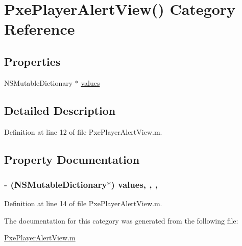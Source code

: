 \hypertarget{category_pxe_player_alert_view_07_08}{\section{Pxe\-Player\-Alert\-View() Category Reference}
\label{category_pxe_player_alert_view_07_08}
}
\subsection*{Properties}
\begin{DoxyCompactItemize}
\item 
N\-S\-Mutable\-Dictionary $\ast$ \hyperlink{category_pxe_player_alert_view_07_08_a2f6dbf6218d685095b0d041309b21723}{values}
\end{DoxyCompactItemize}


\subsection{Detailed Description}


Definition at line 12 of file Pxe\-Player\-Alert\-View.\-m.



\subsection{Property Documentation}
\hypertarget{category_pxe_player_alert_view_07_08_a2f6dbf6218d685095b0d041309b21723}{
\subsubsection[{values}]{\setlength{\rightskip}{0pt plus 5cm}-\/ (N\-S\-Mutable\-Dictionary$\ast$) values\hspace{0.3cm}{\ttfamily [read]}, {\ttfamily [write]}, {\ttfamily [nonatomic]}, {\ttfamily [strong]}}}\label{category_pxe_player_alert_view_07_08_a2f6dbf6218d685095b0d041309b21723}


Definition at line 14 of file Pxe\-Player\-Alert\-View.\-m.



The documentation for this category was generated from the following file\-:\begin{DoxyCompactItemize}
\item 
\hyperlink{_pxe_player_alert_view_8m}{Pxe\-Player\-Alert\-View.\-m}\end{DoxyCompactItemize}
